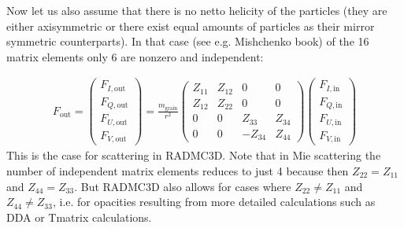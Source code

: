 \documentclass[letterpaper,10pt,english]{sphinxmanual}
\begin{document}
Now let us also assume that there is no netto helicity of the particles
(they are either axisymmetric or there exist equal amounts of particles
as their mirror symmetric counterparts). In that case (see e.g.
Mishchenko book) of the 16 matrix elements only 6 are non\sphinxhyphen{}zero and independent:

\label{\detokenize{dustradtrans:eq-scatmat-for-randorient-nohelic}}\begin{equation*}
\begin{split}F_{\mathrm{out}} = \left(\begin{matrix}
F_{I,\mathrm{out}}\\
F_{Q,\mathrm{out}}\\
F_{U,\mathrm{out}}\\
F_{V,\mathrm{out}}
\end{matrix}\right)
=\frac{m_{\mathrm{grain}}}{r^2}
\left(\begin{matrix}
Z_{11} & Z_{12} & 0 & 0 \\
Z_{12} & Z_{22} & 0 & 0 \\
0 & 0 & Z_{33} & Z_{34} \\
0 & 0 & -Z_{34} & Z_{44}
\end{matrix}\right)
\left(\begin{matrix}
F_{I,\mathrm{in}}\\
F_{Q,\mathrm{in}}\\
F_{U,\mathrm{in}}\\
F_{V,\mathrm{in}}
\end{matrix}\right)\end{split}
\end{equation*}
This is the case for scattering in RADMC\sphinxhyphen{}3D. Note that in Mie scattering the
number of independent matrix elements reduces to just 4 because then
\(Z_{22}=Z_{11}\) and \(Z_{44}=Z_{33}\). But RADMC\sphinxhyphen{}3D also allows for
cases where \(Z_{22}\neq Z_{11}\) and \(Z_{44}\neq Z_{33}\), i.e. for
opacities resulting from more detailed calculations such as DDA or T\sphinxhyphen{}matrix
calculations.
\end{document}
